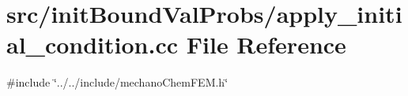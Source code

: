 \section{src/init\+Bound\+Val\+Probs/apply\+\_\+initial\+\_\+condition.cc File Reference}
\label{apply__initial__condition_8cc}
{\ttfamily \#include \char`\"{}../../include/mechano\+Chem\+F\+E\+M.\+h\char`\"{}}\newline
